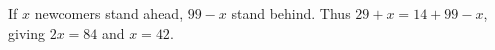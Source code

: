 If $x$ newcomers stand ahead, $99-x$ stand behind. Thus $29+x=14+99-x$, giving $2x=84$ and $\boxed{x=42}$.
